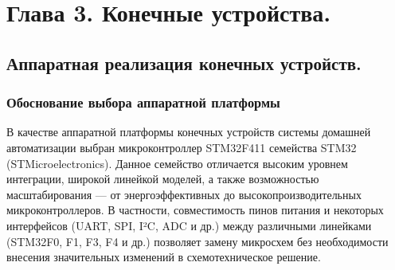 \documentclass[14pt, a4paper]{extreport}
\begin{document}
\newpage

\chapter{Глава 3. Конечные устройства.}

\section{Аппаратная реализация конечных устройств.}

\subsection{Обоснование выбора аппаратной платформы}

В качестве аппаратной платформы конечных устройств системы домашней автоматизации выбран микроконтроллер STM32F411 семейства STM32 (STMicroelectronics). Данное семейство отличается
высоким уровнем интеграции, широкой линейкой моделей, а также возможностью масштабирования — от энергоэффективных до высокопроизводительных микроконтроллеров. В частности,
совместимость пинов питания и некоторых интерфейсов (UART, SPI, I²C, ADC и др.) между различными линейками (STM32F0, F1, F3, F4 и др.) позволяет замену микросхем без необходимости
внесения значительных изменений в схемотехническое решение.
\end{document}
